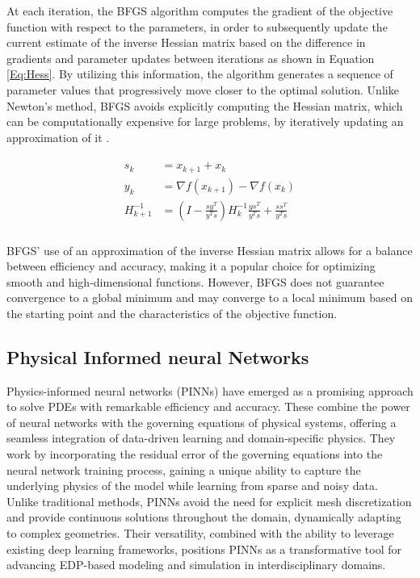 \documentclass[12pt,letterpaper]{article}
\begin{document}
At each iteration, the BFGS algorithm computes the gradient of the objective function with respect to the parameters, in order to subsequently update the current estimate of the inverse Hessian matrix based on the difference in gradients and parameter updates between iterations as shown in Equation \ref{Eq:Hess}. By utilizing this information, the algorithm generates a sequence of parameter values that progressively move closer to the optimal solution. Unlike Newton's method, BFGS avoids explicitly computing the Hessian matrix, which can be computationally expensive for large problems, by iteratively updating an approximation of it \cite{BFGS}.

\begin{align}
  \label{Eq:Hess}
  \begin{split}
    s_k & =  x_{k+1} + x_{k}\\
    y_k & = \nabla f(x_{k+1}) - \nabla f(x_{k})\\
    H_{k+1}^{-1} & = (I-\frac{sy^T}{y^Ts})H_{k}^{-1}\frac{ys^T}{y^Ts} + \frac{ss^T}{y^Ts} 
  \end{split}
\end{align}\\
BFGS' use of an approximation of the inverse Hessian matrix allows for a balance between efficiency and accuracy, making it a popular choice for optimizing smooth and high-dimensional functions. However, BFGS does not guarantee convergence to a global minimum and may converge to a local minimum based on the starting point and the characteristics of the objective function. 

\subsection{Physical Informed neural Networks}

Physics-informed neural networks (PINNs) have emerged as a promising approach to solve PDEs with remarkable efficiency and accuracy. These combine the power of neural networks with the governing equations of physical systems, offering a seamless integration of data-driven learning and domain-specific physics. They work by incorporating the residual error of the governing equations into the neural network training process, gaining a unique ability to capture the underlying physics of the model while learning from sparse and noisy data\cite{raissi2019physics}. \\

Unlike traditional methods, PINNs avoid the need for explicit mesh discretization and provide continuous solutions throughout the domain, dynamically adapting to complex geometries. Their versatility, combined with the ability to leverage existing deep learning frameworks, positions PINNs as a transformative tool for advancing EDP-based modeling and simulation in interdisciplinary domains.\\
\end{document}
